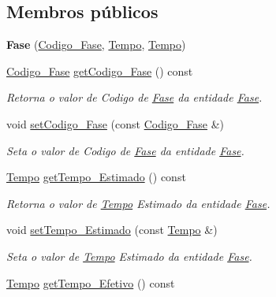 \subsection*{\-Membros públicos}
\begin{DoxyCompactItemize}
\item 
\hypertarget{class_fase_a01205110dcfe61f938e5cbbda81f458f}{
{\bfseries \-Fase} (\hyperlink{class_codigo___fase}{\-Codigo\-\_\-\-Fase}, \hyperlink{class_tempo}{\-Tempo}, \hyperlink{class_tempo}{\-Tempo})}
\label{class_fase_a01205110dcfe61f938e5cbbda81f458f}

\item 
\hyperlink{class_codigo___fase}{\-Codigo\-\_\-\-Fase} \hyperlink{class_fase_a602d9dcd3d2cc62a38815cc92bb2544e}{get\-Codigo\-\_\-\-Fase} () const 
\begin{DoxyCompactList}\small\item\em \-Retorna o valor de \-Codigo de \hyperlink{class_fase}{\-Fase} da entidade \hyperlink{class_fase}{\-Fase}. \end{DoxyCompactList}\item 
void \hyperlink{class_fase_a8558fc7a14dedece24cb05ef45a468ed}{set\-Codigo\-\_\-\-Fase} (const \hyperlink{class_codigo___fase}{\-Codigo\-\_\-\-Fase} \&)
\begin{DoxyCompactList}\small\item\em \-Seta o valor de \-Codigo de \hyperlink{class_fase}{\-Fase} da entidade \hyperlink{class_fase}{\-Fase}. \end{DoxyCompactList}\item 
\hyperlink{class_tempo}{\-Tempo} \hyperlink{class_fase_a2745e6795ee74841ab2568bd6634677f}{get\-Tempo\-\_\-\-Estimado} () const 
\begin{DoxyCompactList}\small\item\em \-Retorna o valor de \hyperlink{class_tempo}{\-Tempo} \-Estimado da entidade \hyperlink{class_fase}{\-Fase}. \end{DoxyCompactList}\item 
void \hyperlink{class_fase_a03725dee42c6222b00278c1e6b335ab7}{set\-Tempo\-\_\-\-Estimado} (const \hyperlink{class_tempo}{\-Tempo} \&)
\begin{DoxyCompactList}\small\item\em \-Seta o valor de \hyperlink{class_tempo}{\-Tempo} \-Estimado da entidade \hyperlink{class_fase}{\-Fase}. \end{DoxyCompactList}\item 
\hyperlink{class_tempo}{\-Tempo} \hyperlink{class_fase_a19537f118a435b148749fdd965e33e7a}{get\-Tempo\-\_\-\-Efetivo} () const 

\end{DoxyCompactItemize}
